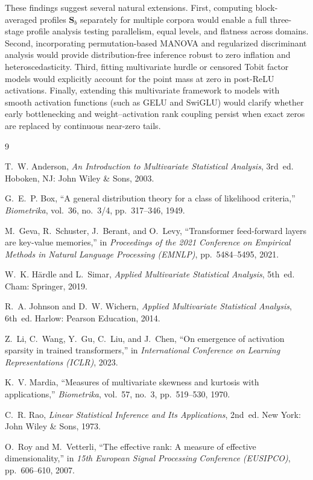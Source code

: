\documentclass[12pt, a4paper, oneside]{report}
\theoremstyle{definition}
\newcommand{\vect}[1]{\mathbf{#1}}
\begin{document}
These findings suggest several natural extensions. First, computing block-averaged profiles $\vect{S}_b$ separately for multiple corpora would enable a full three-stage profile analysis testing parallelism, equal levels, and flatness across domains. Second, incorporating permutation-based MANOVA and regularized discriminant analysis would provide distribution-free inference robust to zero inflation and heteroscedasticity. Third, fitting multivariate hurdle or censored Tobit factor models would explicitly account for the point mass at zero in post-ReLU activations. Finally, extending this multivariate framework to models with smooth activation functions (such as GELU and SwiGLU) would clarify whether early bottlenecking and weight--activation rank coupling persist when exact zeros are replaced by continuous near-zero tails.

\begin{thebibliography}{9}

T.~W. Anderson, \emph{An Introduction to Multivariate Statistical Analysis}, 3rd~ed. Hoboken, NJ: John Wiley \& Sons, 2003.

G.~E.~P. Box, ``A general distribution theory for a class of likelihood criteria,'' \emph{Biometrika}, vol.~36, no.~3/4, pp.~317--346, 1949.

M.~Geva, R.~Schuster, J.~Berant, and O.~Levy, ``Transformer feed-forward layers are key-value memories,'' in \emph{Proceedings of the 2021 Conference on Empirical Methods in Natural Language Processing (EMNLP)}, pp.~5484--5495, 2021.

W.~K. H{\"a}rdle and L.~Simar, \emph{Applied Multivariate Statistical Analysis}, 5th~ed. Cham: Springer, 2019.

R.~A. Johnson and D.~W. Wichern, \emph{Applied Multivariate Statistical Analysis}, 6th~ed. Harlow: Pearson Education, 2014.

Z.~Li, C.~Wang, Y.~Gu, C.~Liu, and J.~Chen, ``On emergence of activation sparsity in trained transformers,'' in \emph{International Conference on Learning Representations (ICLR)}, 2023.

K.~V. Mardia, ``Measures of multivariate skewness and kurtosis with applications,'' \emph{Biometrika}, vol.~57, no.~3, pp.~519--530, 1970.

C.~R. Rao, \emph{Linear Statistical Inference and Its Applications}, 2nd~ed. New York: John Wiley \& Sons, 1973.

O.~Roy and M.~Vetterli, ``The effective rank: A measure of effective dimensionality,'' in \emph{15th European Signal Processing Conference (EUSIPCO)}, pp.~606--610, 2007.

\end{thebibliography}
\end{document}
